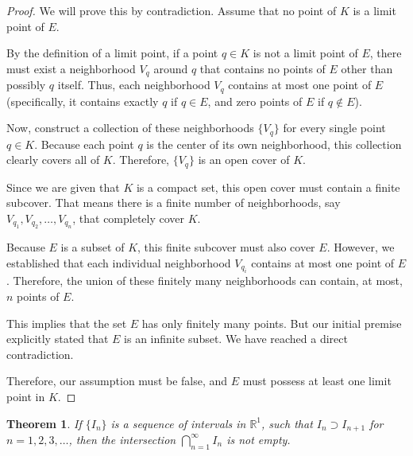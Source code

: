 \documentclass{article}
\theoremstyle{mythm}
\newtheorem{theorem}{Theorem}[section]
\begin{document}
\begin{proof}
We will prove this by contradiction. 
Assume that no point of $K$ is a limit point of $E$. 

By the definition of a limit point, if a point $q \in K$ is not a limit point of $E$, there must exist a neighborhood $V_q$ around $q$ that contains no points of $E$ other than possibly $q$ itself. Thus, each neighborhood $V_q$ contains at most one point of $E$ (specifically, it contains exactly $q$ if $q \in E$, and zero points of $E$ if $q \notin E$).

Now, construct a collection of these neighborhoods $\{V_q\}$ for every single point $q \in K$. Because each point $q$ is the center of its own neighborhood, this collection clearly covers all of $K$. Therefore, $\{V_q\}$ is an open cover of $K$.

Since we are given that $K$ is a compact set, this open cover must contain a finite subcover. That means there is a finite number of neighborhoods, say $V_{q_1}, V_{q_2}, \dots, V_{q_n}$, that completely cover $K$.

Because $E$ is a subset of $K$, this finite subcover must also cover $E$. However, we established that each individual neighborhood $V_{q_i}$ contains at most one point of $E$. Therefore, the union of these finitely many neighborhoods can contain, at most, $n$ points of $E$. 

This implies that the set $E$ has only finitely many points. But our initial premise explicitly stated that $E$ is an infinite subset. We have reached a direct contradiction. 

Therefore, our assumption must be false, and $E$ must possess at least one limit point in $K$.
\end{proof}

\begin{theorem}
If $\{I_n\}$ is a sequence of intervals in $\mathbb{R}^1$, such that $I_n \supset I_{n+1}$ for $n = 1, 2, 3, \dots$, then the intersection $\bigcap_{n=1}^\infty I_n$ is not empty.
\end{theorem}
\end{document}
